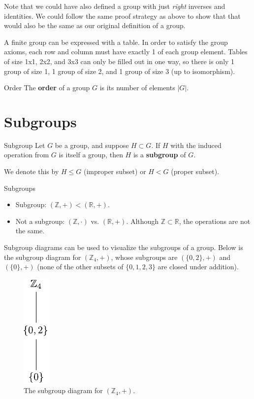 \documentclass[10pt]{report}
\begin{document}
Note that we could have also defined a group with just \textit{right} inverses and identities. We could follow the same proof strategy as above to show that that would also be the same as our original definition of a group.

\begin{note}{}{}
A finite group can be expressed with a table. In order to satisfy the group axioms, each row and column must have exactly 1 of each group element. Tables of size 1x1, 2x2, and 3x3 can only be filled out in one way, so there is only 1 group of size 1, 1 group of size 2, and 1 group of size 3 (up to isomorphism).
\end{note}

\begin{defn}{Order}{}
The \textbf{order} of a group $G$ is its number of elements $|G|$.
\end{defn}



\section{Subgroups}

\begin{defn}{Subgroup}{}
Let $G$ be a group, and suppose $H \subset G$. If $H$ with the induced operation from $G$ is itself a group, then $H$ is a \textbf{subgroup} of $G$.

We denote this by $H \leq G$ (improper subset) or $H < G$ (proper subset).
\end{defn}

\begin{ex}{Subgroups}{}
\begin{itemize}
	\item Subgroup: $(\mathbb{Z}, +) < (\mathbb{R},+)$.
	\item Not a subgroup: $(\mathbb{Z}, \cdot)$ vs. $(\mathbb{R}, +)$. Although $\mathbb{Z} \subset \mathbb{R}$, the operations are not the same.
\end{itemize}
\end{ex}

Subgroup diagrams can be used to visualize the subgroups of a group. Below is the subgroup diagram for $(\mathbb{Z}_4, +)$, whose subgroups are $(\{0,2\}, +)$ and $(\{0\}, +)$ (none of the other subsets of $\{0,1,2,3\}$ are closed under addition).
\begin{figure}[H]
	\centering
	\includegraphics[scale=1]{fig/subgroup-ex.pdf}
	\caption{The subgroup diagram for $(\mathbb{Z}_4, +)$.}
\end{figure}
\end{document}
